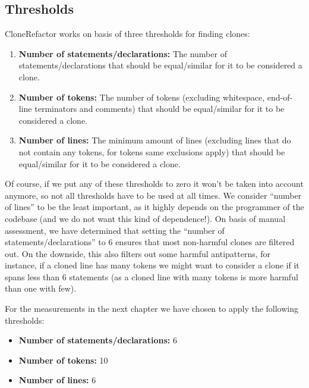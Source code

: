 \documentclass[a4paper]{article}
\begin{document}
\subsection{Thresholds}
CloneRefactor works on basis of three thresholds for finding clones:
\begin{enumerate}
  \item \textbf{Number of statements/declarations:} The number of statements/declarations that should be equal/similar for it to be considered a clone.
  \item \textbf{Number of tokens:} The number of tokens (excluding whitespace, end-of-line terminators and comments) that should be equal/similar for it to be considered a clone.
  \item \textbf{Number of lines:} The minimum amount of lines (excluding lines that do not contain any tokens, for tokens same exclusions apply) that should be equal/similar for it to be considered a clone.
\end{enumerate}
Of course, if we put any of these thresholds to zero it won't be taken into account anymore, so not all thresholds have to be used at all times. We consider ``number of lines'' to be the least important, as it highly depends on the programmer of the codebase (and we do not want this kind of dependence!). On basis of manual assessment, we have determined that setting the ``number of statements/declarations'' to 6 ensures that most non-harmful clones are filtered out. On the downside, this also filters out some harmful antipatterns, for instance, if a cloned line has many tokens we might want to consider a clone if it spans less than 6 statements (as a cloned line with many tokens is more harmful than one with few).

For the measurements in the next chapter we have chosen to apply the following thresholds:
\begin{itemize}
  \item \textbf{Number of statements/declarations:} 6
  \item \textbf{Number of tokens:} 10
  \item \textbf{Number of lines:} 6
\end{itemize}
\end{document}
